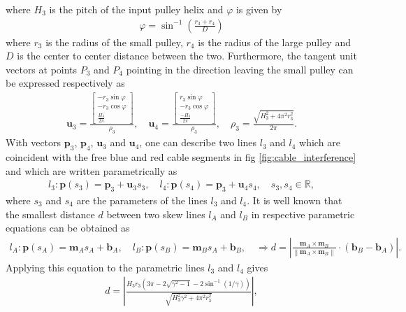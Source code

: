 \documentclass[10pt,cleanfoot]{asme2ej}
\newcommand\abs[1]{\left|#1\right|}
\newcommand\norm[1]{\left\lVert#1\right\rVert}
\begin{document}
where $H_3$ is the pitch of the input pulley helix and $\varphi$ is given by
\begin{align}
\varphi = \sin^{-1}\left(\frac{r_3+r_4}{D}\right)
\end{align} where $r_3$ is the radius of the small pulley, $r_4$ is the radius of the large pulley and $D$ is the center to center distance between the two. Furthermore, the tangent unit vectors at points $P_3$ and $P_4$ pointing in the direction leaving the small pulley can be expressed respectively as 
\begin{align}
\mathbf{u}_3 = \frac{\begin{bmatrix}
-r_3\sin\varphi\\
-r_3\cos\varphi\\
\frac{H_3}{2\pi}
\end{bmatrix}}{\rho_3}, \quad \mathbf{u}_4 =\frac{\begin{bmatrix}
r_3\sin\varphi\\
-r_3\cos\varphi\\
\frac{-H_3}{2\pi}
\end{bmatrix}}{\rho_3}, \quad \rho_3 = \frac{\sqrt{H_3^2+4\pi^2r_3^2}}{2\pi}.
\end{align} 
With vectors $\mathbf{p}_3$, $\mathbf{p}_4$, $\mathbf{u}_3$ and $\mathbf{u}_4$, one can describe two lines $l_3$ and $l_4$ which are coincident with the free blue and red cable segments in fig \ref{fig:cable_interference} and which are written parametrically as
\begin{align}
l_3:\mathbf{p}(s_3) = \mathbf{p}_3 + \mathbf{u}_3s_3, \quad l_4:\mathbf{p}(s_4) = \mathbf{p}_3 + \mathbf{u}_4s_4,\quad s_3,s_4 \in \mathbb{R},
\label{eq:eq_of_two_lines}
\end{align}
where $s_3$ and $s_4$ are the parameters of the lines $l_3$ and $l_4$. It is well known that the smallest distance $d$ between two skew lines $l_A$ and $l_B$ in respective parametric equations can be obtained as \begin{align}
l_A: \mathbf{p}(s_A) = \mathbf{m}_As_A+\mathbf{b}_A,\quad l_B: \mathbf{p}(s_B) = \mathbf{m}_Bs_A+\mathbf{b}_B,\quad \Rightarrow d = \abs{\frac{\mathbf{m}_A\times\mathbf{m}_B}{\norm{\mathbf{m}_A\times\mathbf{m}_B}}\cdot\left(\mathbf{b}_B-\mathbf{b}_A\right)}.
\end{align}
Applying this equation to the parametric lines $l_3$ and $l_4$ gives
\begin{align}
d = \abs{\frac{H_3r_3\left(3\pi-2\sqrt{\gamma^2-1}-2\sin^{-1}(1/\gamma)\right)}{\sqrt{H_3^2\gamma^2+4\pi^2r_3^2}}},
\label{eq:distance_func}
\end{align}
\end{document}
